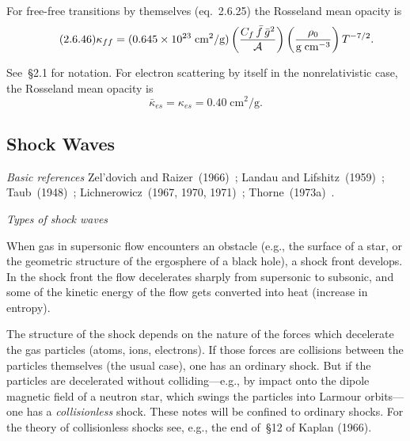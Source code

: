 For free-free transitions by themselves (eq.~2.6.25) the Rosseland mean
opacity is
%
\begin{equation}
\tag{2.6.46}
\kappa_{ff} = (0.645\times 10^{23}\;\text{cm}^2/\text{g})
  \left(\frac{C_f\,\bar{f}\,\bar{g}^2}{\mathcal{A}}\right)
  \left(\frac{\rho_0}{\text{g\;cm}^{-3}}\right) T^{-7/2}.
\end{equation}

See~\S2.1 for notation.  For electron scattering by itself in the nonrelativistic
case, the Rosseland mean opacity is
%
\begin{equation}
\tag{2.6.47}
\bar{\kappa}_{es} = \kappa_{es} = 0.40\;\text{cm}^2/\text{g}.
\end{equation}



\subsection{Shock Waves}
\label{sec:2.7}

\emph{Basic references}\quad
Zel'dovich and Raizer~(1966)~\cite{ZeldovichRaizer1966};
Landau and Lifshitz~(1959)~\cite{LandauLifshitz1959};
Taub~(1948)~\cite{Taub1948};
Lichnerowicz~(1967, 1970, 1971)~\cite{Lichnerowicz1967};
Thorne~(1973a)~\cite{Thorne1973a}.

\bigskip
\noindent
\emph{Types of shock waves}

\medskip
\noindent
When gas in supersonic flow encounters an obstacle (e.g., the surface of a star,
or the geometric structure of the ergosphere of a black hole), a shock front
develops.  In the shock front the flow decelerates sharply from supersonic to
subsonic, and some of the kinetic energy of the flow gets converted into heat
(increase in entropy).

The structure of the shock depends on the nature of the forces which decelerate
the gas particles (atoms, ions, electrons).  If those forces are collisions between
the particles themselves (the usual case), one has an ordinary shock.  But if the
particles are decelerated without colliding---e.g., by impact onto the dipole
magnetic field of a neutron star, which swings the particles into Larmour
orbits---one has a \emph{collisionless} shock.  These notes will be confined to ordinary
shocks.  For the theory of collisionless shocks see, e.g., the end of~\S12 of Kaplan
(1966).

